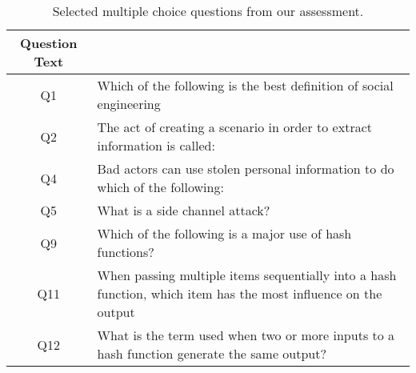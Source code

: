 



\begin{table}[h]
  \scriptsize
  \begin{tabular}{c | p{6cm}}
Question Text  &     \\
\hline
Q1 & Which of the following is the best definition of social engineering \\
Q2  & The act of creating a scenario in order to extract information is called:   \\
Q4  & Bad actors can use stolen personal information to do which of the following: \\
Q5 & What is a side channel attack?  \\
Q9 & Which of the following is a major use of hash functions? \\
Q11 & When passing multiple items sequentially into a hash function, which item has the most influence on the output \\
Q12 & What is the term used when two or more inputs to a hash function generate the same output? \\
\end{tabular}
\caption{Selected multiple choice questions from our assessment.}
\label{fig:assessment}
\end{table}



